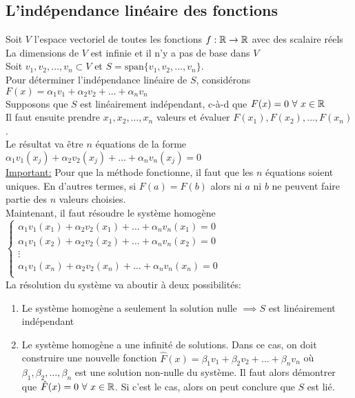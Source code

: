 \subsection{L'indépendance linéaire des fonctions} %
Soit $V$ l'espace vectoriel de toutes les fonctions $f: \mathbb{R} \to \mathbb{R}$ avec des scalaire réels \\
La dimensions de $V$ est infinie et il n'y a pas de base dans $V$ \\
Soit ${v_1, v_2, \dots, v_n} \subset V$ et $S = \text{span}\{v_1, v_2, \dots, v_n\}$. \\
Pour déterminer l'indépendance linéaire de $S$, considérons $F(x) = \alpha_1 v_1 + \alpha_2 v_2 + \dots + \alpha_n v_n$ \\
Supposons que $S$ est linéairement indépendant, c-à-d que $F(x) = 0 \ \forall \ x \in \mathbb{R}$ \\
Il faut ensuite prendre $x_1, x_2, \dots, x_n$ valeurs et évaluer $F(x_1), F(x_2), \dots, F(x_n)$. \\
Le résultat va être $n$ équations de la forme $\alpha_1 v_1(x_j)+ \alpha_2 v_2(x_j)+ \dots + \alpha_n v_n(x_j) = 0$ \\
\underline{Important:} Pour que la méthode fonctionne, il faut que les $n$ équations soient uniques. 
En d'autres termes, si $F(a) = F(b)$ alors ni $a$ ni $b$ ne peuvent faire partie des $n$ valeurs choisies. \\
Maintenant, il faut résoudre le système homogène $\begin{cases}
      \alpha_1 v_1(x_1)+ \alpha_2 v_2(x_1)+ \dots + \alpha_n v_n(x_1) = 0 \\
      \alpha_1 v_1(x_2)+ \alpha_2 v_2(x_2)+ \dots + \alpha_n v_n(x_2) = 0 \\
      \vdots \\
      \alpha_1 v_1(x_n)+ \alpha_2 v_2(x_n)+ \dots + \alpha_n v_n(x_n) = 0 \\
\end{cases}$ \\
La résolution du système va aboutir à deux possibilités: \begin{enumerate}
      \item Le système homogène a seulement la solution nulle $\implies S$ est linéairement indépendant
      \item Le système homogène a une infinité de solutions. Dans ce cas, on doit construire
      une nouvelle fonction $\hat{F}(x) = \beta_1 v_1 + \beta_2 v_2 + \dots + \beta_n v_n$ où $\beta_1, \beta_2, \dots, \beta_n$
      est une solution non-nulle du système. Il faut alors démontrer que $\hat{F}(x) = 0 \ \forall \ x \in \mathbb{R}$. 
      Si c'est le cas, alors on peut conclure que $S$ est lié.
\end{enumerate}

